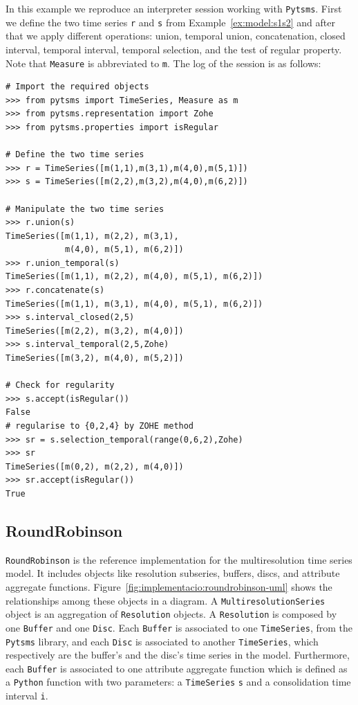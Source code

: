 \begin{example}
  \label{ex:pytsms:example}
  In this example we reproduce an interpreter session working with
  \texttt{Pytsms}. First we define the two time series \texttt{r} and
  \texttt{s} from Example~\ref{ex:model:s1s2} and after that we apply
  different operations: union, temporal union, concatenation, closed
  interval, \zohe{} temporal interval, \zohe{} temporal selection, and
  the test of regular property. Note that \texttt{Measure} is
  abbreviated to \texttt{m}. The log of the session is as follows:

  {\small
\begin{verbatim}
# Import the required objects
>>> from pytsms import TimeSeries, Measure as m
>>> from pytsms.representation import Zohe
>>> from pytsms.properties import isRegular

# Define the two time series
>>> r = TimeSeries([m(1,1),m(3,1),m(4,0),m(5,1)])
>>> s = TimeSeries([m(2,2),m(3,2),m(4,0),m(6,2)])

# Manipulate the two time series
>>> r.union(s)
TimeSeries([m(1,1), m(2,2), m(3,1), 
            m(4,0), m(5,1), m(6,2)])
>>> r.union_temporal(s)
TimeSeries([m(1,1), m(2,2), m(4,0), m(5,1), m(6,2)])
>>> r.concatenate(s) 
TimeSeries([m(1,1), m(3,1), m(4,0), m(5,1), m(6,2)])
>>> s.interval_closed(2,5)
TimeSeries([m(2,2), m(3,2), m(4,0)])
>>> s.interval_temporal(2,5,Zohe)
TimeSeries([m(3,2), m(4,0), m(5,2)])

# Check for regularity
>>> s.accept(isRegular())
False
# regularise to {0,2,4} by ZOHE method
>>> sr = s.selection_temporal(range(0,6,2),Zohe)
>>> sr
TimeSeries([m(0,2), m(2,2), m(4,0)])
>>> sr.accept(isRegular())
True
\end{verbatim}
}
\end{example}





\subsection{RoundRobinson}

\texttt{RoundRobinson} is the reference implementation for the
multiresolution time series model. It includes objects like
resolution subseries, buffers, discs, and attribute aggregate
functions. Figure~\ref{fig:implementacio:roundrobinson-uml} shows the
relationships among these objects in a  diagram. 
%
A \texttt{MultiresolutionSeries} object is an aggregation of
\texttt{Resolution} objects. A \texttt{Resolution} is composed by one
\texttt{Buffer} and one \texttt{Disc}. Each \texttt{Buffer} is
associated to one \texttt{TimeSeries}, from the \texttt{Pytsms}
library, and each \texttt{Disc} is associated to another
\texttt{TimeSeries}, which respectively are the buffer's
and the disc's time series in the  model. Furthermore, each
\texttt{Buffer} is associated to one attribute aggregate function
which is defined as a \texttt{Python} function with two parameters: a
\texttt{TimeSeries} \texttt{s} and a consolidation time interval
\texttt{i}.

